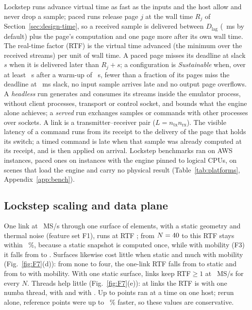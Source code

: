 Lockstep runs advance virtual time as fast as the inputs and the host allow
and never drop a sample; paced runs release page $j$ at the wall time $R_j$ of
Section~\ref{sec:design-time}, so a received sample is delivered between
$D_{\mathrm{lag}}$ (\numPacedLagMs~ms by default) plus the page's computation and one page more
after its own wall time. The real-time factor (RTF) is the virtual time advanced (the minimum
over the received streams) per unit of wall time. A paced page misses its deadline at slack
$s$ when it is delivered later than $R_j+s$; a configuration is \emph{Sustainable} when, over at
least \numSustainMinDurationS~s after a warm-up of \numSustainWarmupS~s, fewer than a fraction
\numSustainMissRate{} of its pages miss the deadline at \numSustainSlackMs~ms slack, no input
sample arrives late and no output page overflows. A \emph{headless} run generates and consumes
its streams inside the emulator process, without client processes, transport or control
socket, and bounds what the engine alone achieves; a \emph{served} run exchanges samples or
commands with other processes over sockets. A link is a transmitter--receiver pair
($L=n_{\mathrm{tx}}n_{\mathrm{rx}}$). The visible latency of a command runs from its
receipt to the delivery of the page that holds its switch; a timed command is late when that
sample was already computed at its receipt, and is then applied on arrival.
Lockstep benchmarks ran on AWS \txtHostServer{} instances, paced ones on
\txtHostPaced{} instances with the engine pinned to \numPacedEngineCpus{} logical CPUs, on
scenes that load the engine and carry no physical result (Table~\ref{tab:platforms},
Appendix~\ref{app:bench}).

\subsection{Lockstep scaling and data plane}\label{sec:wc-data}
One link at \numBtwoBaseMsps~MS/s through one surface of \numBtwoBaseN{}
elements, with a static geometry and thermal noise (feature set F1), runs at RTF
\numBtwoBaseRtf; from $N=40$ to \numBtwoNmax{} this RTF stays within
\numBtwoNspreadPct~\%, because a static snapshot is computed once, while with mobility (F3) it
falls from \numBtwoFthreeRtfSmall{} to \numBtwoFthreeRtfLarge. Surfaces likewise cost little
when static and much with mobility (Fig.~\ref{fig:F7}(d)): from none to four, the one-link RTF
falls from \numBtwoRzeroStaticRtf{} to \numBtwoRfourStaticRtf{} static and from
\numBtwoRzeroMobileRtf{} to \numBtwoRfourMobileRtf{} with mobility. With one static surface, \numBtwoMaxLinks{} links keep RTF${}\geq1$ at
\numBtwoBaseMsps~MS/s for every $N$. Threads help little (Fig.~\ref{fig:F7}(e)): at
\numBtwoMaxLinks{} links the RTF is \numBtwoThrOneRtf{} with one numba thread,
\numBtwoThrBestRtf{} with \numBtwoThrBest{} and \numBtwoThrMaxRtf{} with \numBtwoThrMax.
Up to \numBtwoSlots{} points ran at a time on one host; rerun alone,
reference points were up to \numBtwoIsoMaxPct~\% faster, so these values are conservative.

